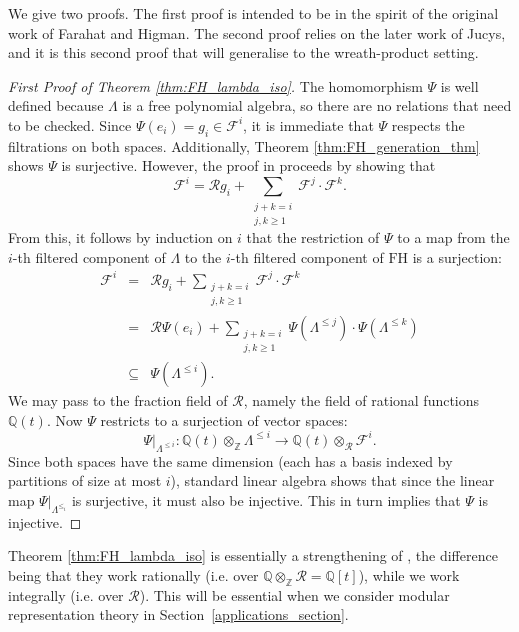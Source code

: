 \documentclass[ALCO,Unicode]{cedram}
\newcommand{\FH}{\mathrm{FH}}
\newcommand{\FH}{\mathrm{FH}}
\begin{document}
We give two proofs. The first proof is intended to be in the spirit of the original work of Farahat and Higman. The second proof relies on the later work of Jucys, and it is this second proof that will generalise to the wreath-product setting.
\begin{proof}[First Proof of Theorem \ref{thm:FH_lambda_iso}]
The homomorphism $\Psi$ is well defined because $\Lambda$ is a free polynomial algebra, so there are no relations that need to be checked. Since $\Psi(e_i) = g_i \in \mathcal{F}^i$, it is immediate that $\Psi$ respects the filtrations on both spaces. Additionally, Theorem \ref{thm:FH_generation_thm} shows $\Psi$ is surjective. However, the proof in \cite{FarahatHigman} proceeds by showing that \[
\mathcal{F}^i = \mathcal{R}g_i + \sum_{\substack{j+k = i \\ j,k \geq 1}}\mathcal{F}^j \cdot \mathcal{F}^k.
\]
From this, it follows by induction on $i$ that the restriction of $\Psi$ to a map from the $i$-th filtered component of $\Lambda$ to the $i$-th filtered component of $\FH$ is a surjection:
\begin{eqnarray*}
\mathcal{F}^i &=& \mathcal{R}g_i + \sum_{\substack{j+k = i \\ j,k \geq 1}}\mathcal{F}^j \cdot \mathcal{F}^k \\
&=& \mathcal{R}\Psi(e_i) + \sum_{\substack{j+k = i \\ j,k \geq 1}}\Psi(\Lambda^{\leq j}) \cdot \Psi(\Lambda^{\leq k}) \\
&\subseteq& \Psi(\Lambda^{\leq i}).
\end{eqnarray*}
We may pass to the fraction field of $\mathcal{R}$, namely the field of rational functions $\mathbb{Q}(t)$. Now $\Psi$ restricts to a surjection of vector spaces:
\[
\left.\Psi\right|_{\Lambda^{\leq i}}:
\mathbb{Q}(t) \otimes_{\mathbb{Z}} \Lambda^{\leq i} \to \mathbb{Q}(t) \otimes_{\mathcal{R}} \mathcal{F}^i.
\]
Since both spaces have the same dimension (each has a basis indexed by partitions of size at most $i$), standard linear algebra shows that since the linear map $\left.\Psi\right|_{\Lambda^{\leq_i}}$ is surjective, it must also be injective. This in turn implies that $\Psi$ is injective.
\end{proof}

Theorem \ref{thm:FH_lambda_iso} is essentially a strengthening of \cite[Theorem 3.1]{CorteelGoupilSchaeffer}, the difference being that they work rationally (i.e. over $\mathbb{Q} \otimes_{\mathbb{Z}} \mathcal{R} = \mathbb{Q}[t]$), while we work integrally (i.e. over $\mathcal{R}$). This will be essential when we consider modular representation theory in Section~\ref{applications_section}.
\end{document}
